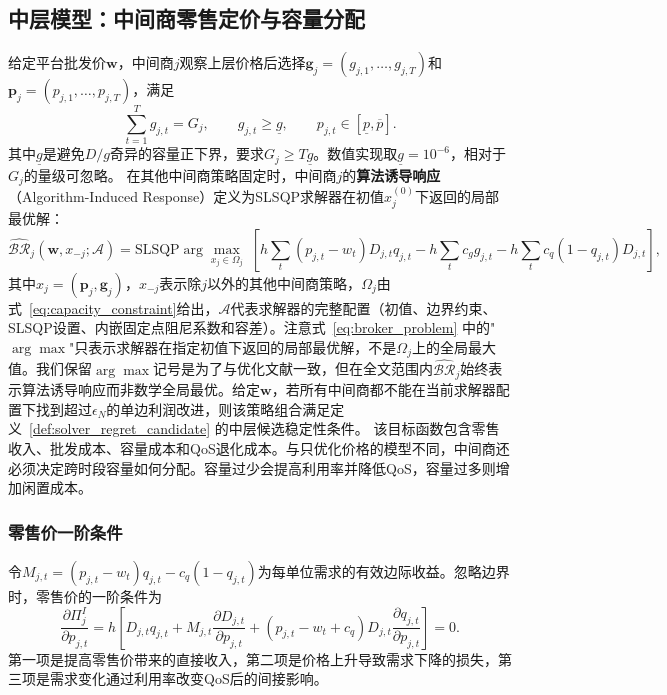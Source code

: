 \documentclass[UTF8,11pt]{ctexart}
\newcommand{\D}{D}
\newcommand{\w}{\boldsymbol{w}}
\newcommand{\p}{\boldsymbol{p}}
\newcommand{\g}{\boldsymbol{g}}
\begin{document}
\subsection{中层模型：中间商零售定价与容量分配}
\label{sec:middle_intermediary}

给定平台批发价$\w$，中间商$j$观察上层价格后选择$\g_j=(g_{j,1},\ldots,g_{j,T})$和$\p_j=(p_{j,1},\ldots,p_{j,T})$，满足
\begin{equation}
  \sum_{t=1}^{T}g_{j,t}=G_j,\qquad g_{j,t}\ge \underline g,\qquad
  p_{j,t}\in[\underline p,\overline p].
  \label{eq:capacity_constraint}
\end{equation}
其中$\underline g$是避免$D/g$奇异的容量正下界，要求$G_j\ge T\underline g$。数值实现取$\underline g=10^{-6}$，相对于$G_j$的量级可忽略。
在其他中间商策略固定时，中间商$j$的\textbf{算法诱导响应}（Algorithm-Induced Response）定义为SLSQP求解器在初值$x_j^{(0)}$下返回的局部最优解：
\begin{equation}
  \widehat{\mathcal{BR}}_j(\w,x_{-j};\mathcal{A})
  =\text{SLSQP}
  \arg\max_{x_j\in\Omega_j}\;
  \left[
  h\sum_{t}(p_{j,t}-w_t)\D_{j,t}q_{j,t}
  -h\sum_t c_g g_{j,t}
  -h\sum_t c_q(1-q_{j,t})\D_{j,t}
  \right],
  \label{eq:broker_problem}
\end{equation}
其中$x_j=(\p_j,\g_j)$，$x_{-j}$表示除$j$以外的其他中间商策略，$\Omega_j$由式~\eqref{eq:capacity_constraint}给出，$\mathcal{A}$代表求解器的完整配置（初值、边界约束、SLSQP设置、内嵌固定点阻尼系数和容差）。注意式~\eqref{eq:broker_problem} 中的"$\arg\max$"只表示求解器在指定初值下返回的局部最优解，不是$\Omega_j$上的全局最大值。我们保留$\arg\max$记号是为了与优化文献一致，但在全文范围内$\widehat{\mathcal{BR}}_j$始终表示算法诱导响应而非数学全局最优。给定$\w$，若所有中间商都不能在当前求解器配置下找到超过$\epsilon_N$的单边利润改进，则该策略组合满足定义~\ref{def:solver_regret_candidate} 的中层候选稳定性条件。
该目标函数包含零售收入、批发成本、容量成本和QoS退化成本。与只优化价格的模型不同，中间商还必须决定跨时段容量如何分配。容量过少会提高利用率并降低QoS，容量过多则增加闲置成本。

\subsubsection{零售价一阶条件}

令$M_{j,t}=(p_{j,t}-w_t)q_{j,t}-c_q(1-q_{j,t})$为每单位需求的有效边际收益。忽略边界时，零售价的一阶条件为
\begin{equation}
  \frac{\partial\Pi^I_j}{\partial p_{j,t}}
  =h\left[
  \D_{j,t}q_{j,t}
  +M_{j,t}\frac{\partial \D_{j,t}}{\partial p_{j,t}}
  +(p_{j,t}-w_t+c_q)\D_{j,t}\frac{\partial q_{j,t}}{\partial p_{j,t}}
  \right]=0.
  \label{eq:retail_foc}
\end{equation}
第一项是提高零售价带来的直接收入，第二项是价格上升导致需求下降的损失，第三项是需求变化通过利用率改变QoS后的间接影响。
\end{document}
